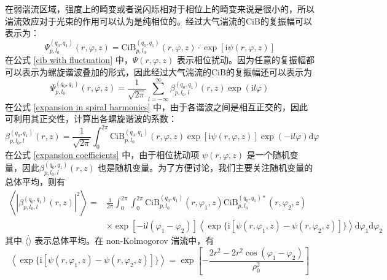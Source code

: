 \documentclass[master]{thesis-uestc}
\begin{document}
在弱湍流区域，强度上的畸变或者说闪烁相对于相位上的畸变来说是很小的，所以湍流效应对于光束的作用可以认为是纯相位的。经过大气湍流的CiB的复振幅可以表示为：
 \begin{equation}\label{cib with fluctuation}
  \Psi^{(q_0,q_1)}_{p,l_0}(r,\varphi,z)=\mathrm{CiB}^{(q_0,q_1)}_{p,l_0}(r,\varphi,z)\cdot\exp[\mathrm{i}\psi(r,\varphi,z)]
\end{equation}
\noindent 在公式 \eqref{cib with fluctuation} 中，$\Psi(r,\varphi,z)$ 表示相位扰动。因为任意的复振幅都可以表示为螺旋谐波叠加的形式\citeup{}，因此经过大气湍流的CiB的复振幅还可以表示为
\begin{equation}\label{expansion in spiral harmonics}
  \Psi^{(q_0,q_1)}_{p,l_0}(r,\varphi,z)=\frac{1}{\sqrt{2\pi}}\sum\limits_{l=-\infty}^\infty\beta^{(q_0,q_1)}_{p,l_0,l}(r,z)\exp(\mathrm{i}l\varphi)
\end{equation}
\noindent 在公式 \eqref{expansion in spiral harmonics} 中，由于各谐波之间是相互正交的，因此可利用其正交性，计算出各螺旋谐波的系数：
\begin{equation}\label{expansion coefficients}
  \beta^{(q_0,q_1)}_{p,l_0,l}(r,z)=\frac{1}{\sqrt{2\pi}}\int_0^{2\pi}\mathrm{CiB}^{(q_0,q_1)}_{p,l_0}(r,\varphi,z)
  \exp[\mathrm{i}\psi(r,\varphi,z)]\exp(-\mathrm{i}l\varphi)\mathrm{d}\varphi
\end{equation}
\noindent 在公式 \eqref{expansion coefficients} 中，由于相位扰动项 $\psi(r,\varphi,z)$ 是一个随机变量，因此$\beta^{(q_0,q_1)}_{p,l_0,l}(r,z)$ 也是随机变量。为了方便讨论，我们主要关注随机变量的总体平均，则有
\begin{equation}
  \begin{array}{rl}\label{turbulence statistics}
    \left<\left|\beta^{(q_0,q_1)}_{p,l_0,l}(r,z)\right|^2\right>=&\displaystyle\frac{1}{2\pi}\int_0^{2\pi}\int_0^{2\pi}
      \mathrm{CiB}^{(q_0,q_1)}_{p,l_0}(r,\varphi_1,z)\mathrm{CiB}^{(q_0,q_1)*}_{p,l_0}(r,\varphi_2,z)\\[0.5cm]
    &\times\exp[-\mathrm{i}l(\varphi_1-\varphi_2)]\left<\exp\{\mathrm{i}\left[\psi(r,\varphi_1,z)-\psi(r,\varphi_2,z)\right]\}\right>
     \mathrm{d}\varphi_1\mathrm{d}\varphi_2
  \end{array}
\end{equation}
\noindent 其中 $\langle\dot\rangle$ 表示总体平均。在 non-Kolmogorov 湍流中，有\citeup{}
\begin{equation}\label{phase statistics}
  \left<\exp\{\mathrm{i}\left[\psi(r,\varphi_1,z)-\psi(r,\varphi_2,z)\right]\}\right>
  =\exp\left[-\frac{2r^2-2r^2\cos(\varphi_1-\varphi_2)}{\rho_0^2}\right]
\end{equation}
\end{document}
